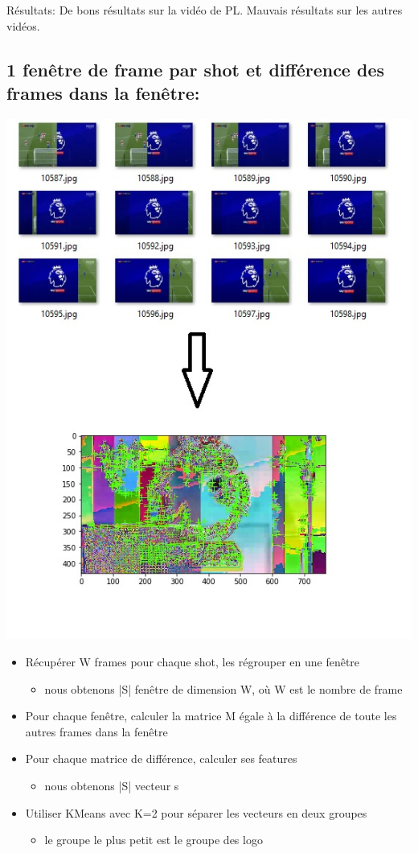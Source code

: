 \documentclass[11pt]{article}
\begin{document}
Résultats:
De bons résultats sur la vidéo de PL.
Mauvais résultats sur les autres vidéos.


\subsection{1 fenêtre de frame par shot et différence des frames dans la fenêtre:}
\label{sec-6-7}
\includegraphics[width=.9\linewidth]{orb_window_diff_res.JPG}
\begin{itemize}
\item Récupérer W frames pour chaque shot, les régrouper en une fenêtre
\begin{itemize}
\item nous obtenons |S| fenêtre de dimension W, où W est le nombre de frame
\end{itemize}
\item Pour chaque fenêtre, calculer la matrice M égale à la différence de toute 
les autres frames dans la fenêtre
\item Pour chaque matrice de différence, calculer ses features
\begin{itemize}
\item nous obtenons |S| vecteur s
\end{itemize}
\item Utiliser KMeans avec K=2 pour séparer les vecteurs en deux groupes 
\begin{itemize}
\item le groupe le plus petit est le groupe des logo
\end{itemize}
\end{itemize}
\end{document}
